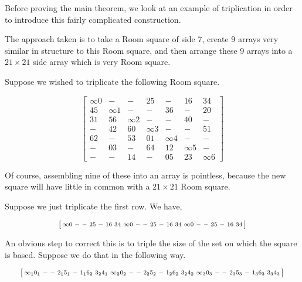 Before proving the main theorem, we look at an example of triplication in order to introduce this fairly complicated construction.

The approach taken is to take a Room square of side 7, create 9 arrays very similar in structure to this Room square, and then arrange these 9 arrays into a $21 \times 21$ side array which is very Room square.  

\begin{example}
Suppose we wished to triplicate the following Room square.

\begin{equation}
  \begin{bmatrix}
    \infty 0 &   - &  -  &  25 &   - &  16 &  34 \\
    45 &  \infty 1 &  -  &   - &  36 &   - &  20 \\
    31 &  56 &  \infty 2 &   - &   - &  40 &   - \\
     - &  42 &  60 &  \infty 3 &   - &   - &  51 \\
    62 &   - &  53 &  01 &  \infty 4 &   - &   - \\
     - &  03 &   - &  64 &  12 &  \infty 5 &   - \\
     - &   - &  14 &   - &  05 &  23 &  \infty 6 
  \end{bmatrix}
  \label{eq:triple-room}
\end{equation}

Of course, assembling nine of these into an array is pointless, because the new square will have little in common with a $21 \times 21$ Room square.

Suppose we just triplicate the first row.
We have,

\begin{equation*}
  \begin{bsmallmatrix}
    \infty 0 & - & - & 25 & - & 16 & 34 & \infty 0 & - & - & 25 & - & 16 & 34 & \infty 0 & - & - & 25 & - & 16 & 34 \\
  \end{bsmallmatrix}
\end{equation*}

An obvious step to correct this is to triple the size of the set on which the square is based.
Suppose we do that in the following way.

\begin{equation*}
  \begin{bsmallmatrix}
    \infty_{1} 0_{1} & - & - & 2_{1}5_{1} & - & 1_{1}6_{2} & 3_{2}4_{1} & \infty_{2} 0_{2} & - & - & 2_{2}5_{2} & - & 1_{2}6_{2} & 3_{2}4_{2} & \infty_{3} 0_{3} & - & - & 2_{3}5_{3} & - & 1_{3}6_{3} & 3_{3}4_{3} \\
  \end{bsmallmatrix}
\end{equation*}


\end{example}
